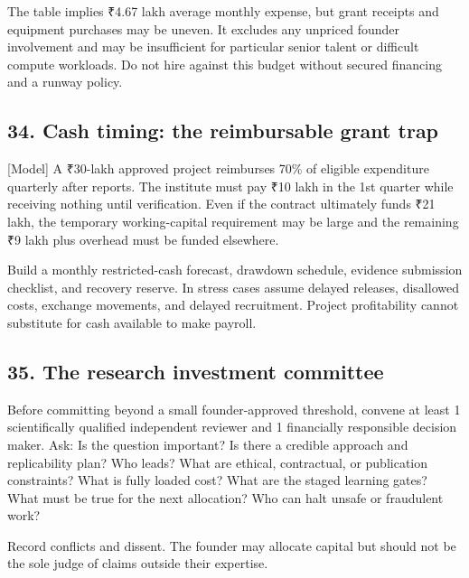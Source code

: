 The table implies ₹4.67 lakh average monthly expense, but grant receipts and equipment purchases may be uneven. It excludes any unpriced founder involvement and may be insufficient for particular senior talent or difficult compute workloads. Do not hire against this budget without secured financing and a runway policy.

\subsection{34. Cash timing: the reimbursable grant trap}

[Model] A ₹30-lakh approved project reimburses 70\% of eligible expenditure quarterly after reports. The institute must pay ₹10 lakh in the 1st quarter while receiving nothing until verification. Even if the contract ultimately funds ₹21 lakh, the temporary working-capital requirement may be large and the remaining ₹9 lakh plus overhead must be funded elsewhere.

Build a monthly restricted-cash forecast, drawdown schedule, evidence submission checklist, and recovery reserve. In stress cases assume delayed releases, disallowed costs, exchange movements, and delayed recruitment. Project profitability cannot substitute for cash available to make payroll.

\subsection{35. The research investment committee}

Before committing beyond a small founder-approved threshold, convene at least 1 scientifically qualified independent reviewer and 1 financially responsible decision maker. Ask: Is the question important? Is there a credible approach and replicability plan? Who leads? What are ethical, contractual, or publication constraints? What is fully loaded cost? What are the staged learning gates? What must be true for the next allocation? Who can halt unsafe or fraudulent work?

Record conflicts and dissent. The founder may allocate capital but should not be the sole judge of claims outside their expertise.
